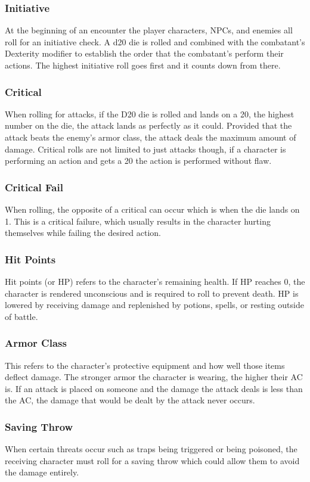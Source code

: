 \documentclass[12pt,a4paper]{report}
\begin{document}
		\subsubsection{Initiative}
			At the beginning of an encounter the player characters, NPCs, and enemies all roll for an initiative check. A d20 die is rolled and combined with the combatant's Dexterity modifier to establish the order that the combatant's perform their actions. The highest initiative roll goes first and it counts down from there.
		\subsubsection{Critical}
			When rolling for attacks, if the D20 die is rolled and lands on a 20, the highest number on the die, the attack lands as perfectly as it could. Provided that the attack beats the enemy's armor class, the attack deals the maximum amount of damage. Critical rolls are not limited to just attacks though, if a character is performing an action and gets a 20 the action is performed without flaw.
		\subsubsection{Critical Fail}
			When rolling, the opposite of a critical can occur which is when the die lands on 1. This is a critical failure, which usually results in the character hurting themselves while failing the desired action.
		\subsubsection{Hit Points}
			Hit points (or HP) refers to the character's remaining health. If HP reaches 0, the character is rendered unconscious and is required to roll to prevent death. HP is lowered by receiving damage and replenished by potions, spells, or resting outside of battle.
		\subsubsection{Armor Class}
			This refers to the character's protective equipment and how well those items deflect damage. The stronger armor the character is wearing, the higher their AC is. If an attack is placed on someone and the damage the attack deals is less than the AC, the damage that would be dealt by the attack never occurs. 
		\subsubsection{Saving Throw}
			When certain threats occur such as traps being triggered or being poisoned, the receiving character must roll for a saving throw which could allow them to avoid the damage entirely.
\end{document}
